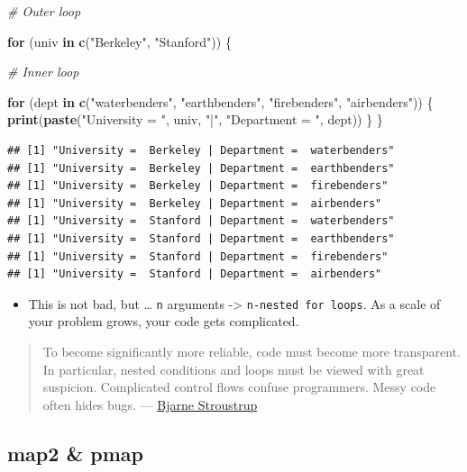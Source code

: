 \documentclass[
]{book}
\newenvironment{Shaded}{\begin{snugshade}}{\end{snugshade}}
\newcommand{\CommentTok}[1]{\textcolor[rgb]{0.56,0.35,0.01}{\textit{#1}}}
\newcommand{\ControlFlowTok}[1]{\textcolor[rgb]{0.13,0.29,0.53}{\textbf{#1}}}
\newcommand{\FunctionTok}[1]{\textcolor[rgb]{0.13,0.29,0.53}{\textbf{#1}}}
\newcommand{\NormalTok}[1]{#1}
\newcommand{\StringTok}[1]{\textcolor[rgb]{0.31,0.60,0.02}{#1}}
\providecommand{\tightlist}{%
  \setlength{\itemsep}{0pt}\setlength{\parskip}{0pt}}
\begin{document}
\begin{Shaded}
\begin{Highlighting}[]
\CommentTok{\# Outer loop}

\ControlFlowTok{for}\NormalTok{ (univ }\ControlFlowTok{in} \FunctionTok{c}\NormalTok{(}\StringTok{"Berkeley"}\NormalTok{, }\StringTok{"Stanford"}\NormalTok{)) \{}

  \CommentTok{\# Inner loop}

  \ControlFlowTok{for}\NormalTok{ (dept }\ControlFlowTok{in} \FunctionTok{c}\NormalTok{(}\StringTok{"waterbenders"}\NormalTok{, }\StringTok{"earthbenders"}\NormalTok{, }\StringTok{"firebenders"}\NormalTok{, }\StringTok{"airbenders"}\NormalTok{)) \{}
    \FunctionTok{print}\NormalTok{(}\FunctionTok{paste}\NormalTok{(}\StringTok{"University = "}\NormalTok{, univ, }\StringTok{"|"}\NormalTok{, }\StringTok{"Department = "}\NormalTok{, dept))}
\NormalTok{  \}}
\NormalTok{\}}
\end{Highlighting}
\end{Shaded}

\begin{verbatim}
## [1] "University =  Berkeley | Department =  waterbenders"
## [1] "University =  Berkeley | Department =  earthbenders"
## [1] "University =  Berkeley | Department =  firebenders"
## [1] "University =  Berkeley | Department =  airbenders"
## [1] "University =  Stanford | Department =  waterbenders"
## [1] "University =  Stanford | Department =  earthbenders"
## [1] "University =  Stanford | Department =  firebenders"
## [1] "University =  Stanford | Department =  airbenders"
\end{verbatim}

\begin{itemize}
\tightlist
\item
  This is not bad, but \ldots{} \texttt{n} arguments -\textgreater{} \texttt{n-nested\ for\ loops}. As a scale of your problem grows, your code gets complicated.
\end{itemize}

\begin{quote}
To become significantly more reliable, code must become more transparent. In particular, nested conditions and loops must be viewed with great suspicion. Complicated control flows confuse programmers. Messy code often hides bugs. --- \href{https://en.wikipedia.org/wiki/Bjarne_Stroustrup}{Bjarne Stroustrup}
\end{quote}

\subsection{map2 \& pmap}\label{map2-pmap}
\end{document}
